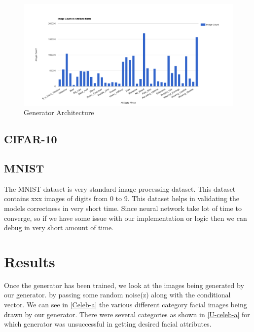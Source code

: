 \begin{figure}[H]
  \centering
    \includegraphics[scale=.3, angle=0]{Files/celeba-visualize.png}
    \caption[Generator Architecture]{Generator Architecture\cite{DCGAN}}
    \label{fig:celeba}
\end{figure}
\subsection{CIFAR-10}

\subsection{MNIST}
The MNIST dataset is very standard image processing dataset. This dataset contains xxx images of digits from 0 to 9. This dataset helps in validating the models correctness in very short time. Since neural  network take lot of time to converge, so if we have some issue with our implementation or logic then we can debug in very short amount of time.

\section{Results}

Once the generator has been trained, we look at the images being generated by our generator. by passing some random noise(z) along with the conditional vector. We can see in \cref{Celeb-a} the various different category facial images being drawn by our generator. There were several categories as shown in \cref{U-celeb-a} for which generator was unsuccessful in getting desired facial attributes.

  

